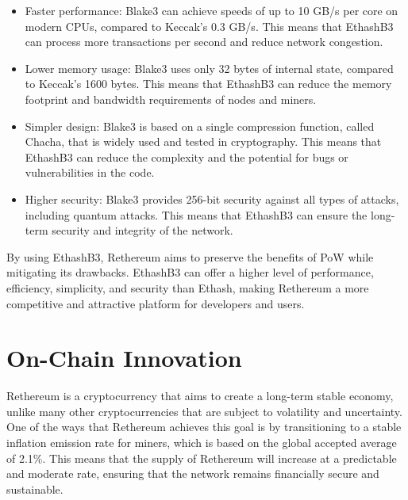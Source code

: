 \documentclass[a4paper,onecolumn, superscriptaddress,10pt,accepted=2020-05-01,issue=1, volume=2, shorttitle=papers]{compositionalityarticle}
\begin{document}
\begin{itemize}
    \item Faster performance: Blake3 can achieve speeds of up to 10 GB/s per core on modern CPUs, compared to Keccak's 0.3 GB/s. This means that EthashB3 can process more transactions per second and reduce network congestion.
\end{itemize}
\begin{itemize}
    \item Lower memory usage: Blake3 uses only 32 bytes of internal state, compared to Keccak's 1600 bytes. This means that EthashB3 can reduce the memory footprint and bandwidth requirements of nodes and miners.
\end{itemize}
\begin{itemize}
    \item Simpler design: Blake3 is based on a single compression function, called Chacha, that is widely used and tested in cryptography. This means that EthashB3 can reduce the complexity and the potential for bugs or vulnerabilities in the code.
\end{itemize}
\begin{itemize}
    \item Higher security: Blake3 provides 256-bit security against all types of attacks, including quantum attacks. This means that EthashB3 can ensure the long-term security and integrity of the network.
\end{itemize}

\vspace{0.3cm}

By using EthashB3, Rethereum aims to preserve the benefits of PoW while mitigating its drawbacks. EthashB3 can offer a higher level of performance, efficiency, simplicity, and security than Ethash, making Rethereum a more competitive and attractive platform for developers and users.

\newpage

\section{On-Chain Innovation}

Rethereum is a cryptocurrency that aims to create a long-term stable economy, unlike many other cryptocurrencies that are subject to volatility and uncertainty. One of the ways that Rethereum achieves this goal is by transitioning to a stable inflation emission rate for miners, which is based on the global accepted average of 2.1\%. This means that the supply of Rethereum will increase at a predictable and moderate rate, ensuring that the network remains financially secure and sustainable.
\end{document}

